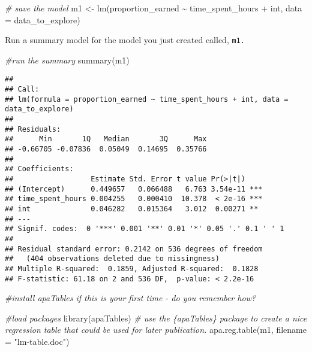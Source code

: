 \documentclass[
]{article}
\newenvironment{Shaded}{\begin{snugshade}}{\end{snugshade}}
\newcommand{\AttributeTok}[1]{\textcolor[rgb]{0.77,0.63,0.00}{#1}}
\newcommand{\CommentTok}[1]{\textcolor[rgb]{0.56,0.35,0.01}{\textit{#1}}}
\newcommand{\FunctionTok}[1]{\textcolor[rgb]{0.00,0.00,0.00}{#1}}
\newcommand{\NormalTok}[1]{#1}
\newcommand{\OtherTok}[1]{\textcolor[rgb]{0.56,0.35,0.01}{#1}}
\newcommand{\SpecialCharTok}[1]{\textcolor[rgb]{0.00,0.00,0.00}{#1}}
\newcommand{\StringTok}[1]{\textcolor[rgb]{0.31,0.60,0.02}{#1}}
\begin{document}
\begin{Shaded}
\begin{Highlighting}[]
\CommentTok{\# save the model}
\NormalTok{m1 }\OtherTok{\textless{}{-}} \FunctionTok{lm}\NormalTok{(proportion\_earned }\SpecialCharTok{\textasciitilde{}}\NormalTok{ time\_spent\_hours }\SpecialCharTok{+}\NormalTok{ int, }\AttributeTok{data =}\NormalTok{ data\_to\_explore)}
\end{Highlighting}
\end{Shaded}

Run a summary model for the model you just created called, \texttt{m1.}

\begin{Shaded}
\begin{Highlighting}[]
\CommentTok{\#run the summary}
\FunctionTok{summary}\NormalTok{(m1)}
\end{Highlighting}
\end{Shaded}

\begin{verbatim}
## 
## Call:
## lm(formula = proportion_earned ~ time_spent_hours + int, data = data_to_explore)
## 
## Residuals:
##      Min       1Q   Median       3Q      Max 
## -0.66705 -0.07836  0.05049  0.14695  0.35766 
## 
## Coefficients:
##                  Estimate Std. Error t value Pr(>|t|)    
## (Intercept)      0.449657   0.066488   6.763 3.54e-11 ***
## time_spent_hours 0.004255   0.000410  10.378  < 2e-16 ***
## int              0.046282   0.015364   3.012  0.00271 ** 
## ---
## Signif. codes:  0 '***' 0.001 '**' 0.01 '*' 0.05 '.' 0.1 ' ' 1
## 
## Residual standard error: 0.2142 on 536 degrees of freedom
##   (404 observations deleted due to missingness)
## Multiple R-squared:  0.1859, Adjusted R-squared:  0.1828 
## F-statistic: 61.18 on 2 and 536 DF,  p-value: < 2.2e-16
\end{verbatim}

\begin{Shaded}
\begin{Highlighting}[]
\CommentTok{\#install apaTables if this is your first time {-} do you remember how?}

\CommentTok{\#load packages}
\FunctionTok{library}\NormalTok{(apaTables)}
\CommentTok{\# use the \{apaTables\} package to create a nice regression table that could be used for later publication.}
\FunctionTok{apa.reg.table}\NormalTok{(m1, }\AttributeTok{filename =} \StringTok{"lm{-}table.doc"}\NormalTok{)}
\end{Highlighting}
\end{Shaded}
\end{document}
